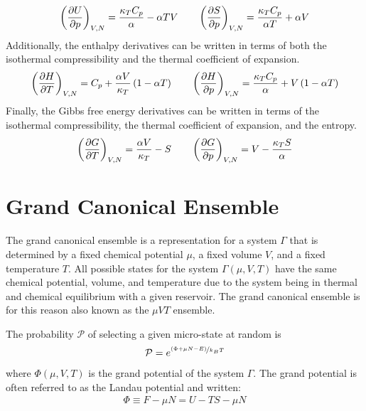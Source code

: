 \begin{align}
    \left( \pdv{U}{p} \right )_{V,N} = \frac{\kappa_T C_p}{\alpha} - \alpha TV \quad\quad
    \left( \pdv{S}{p} \right )_{V,N} = \frac{\kappa_T C_p}{\alpha T} + \alpha V
\end{align}
Additionally, the enthalpy derivatives can be written in terms of both the isothermal compressibility and the thermal coefficient of expansion.
\begin{align}
    \left( \pdv{H}{T} \right )_{V,N} = C_p + \frac{\alpha V}{\kappa_T}\left(1-\alpha T\right) \quad\quad
    \left( \pdv{H}{p} \right )_{V,N} = \frac{\kappa_T C_p}{\alpha} + V\left(1-\alpha T\right)
\end{align}
Finally, the Gibbs free energy derivatives can be written in terms of the isothermal compressibility, the thermal coefficient of expansion, and the entropy.
\begin{align}
    \left( \pdv{G}{T} \right )_{V,N} = \frac{\alpha V}{\kappa_T}-S \quad\quad
    \left( \pdv{G}{p} \right )_{V,N} = V-\frac{\kappa_T S}{\alpha}
\end{align}

\section{Grand Canonical Ensemble}
The grand canonical ensemble is a representation for a system $\Gamma$ that is determined by a fixed chemical potential $\mu$, a fixed volume $V$, and a fixed temperature $T$. All possible states for the system $\Gamma\left(\mu,V,T\right)$ have the same chemical potential, volume, and temperature due to the system being in thermal and chemical equilibrium with a given reservoir.
The grand canonical ensemble is for this reason also known as the $\mu VT$ ensemble.

The probability $\mathcal{P}$ of selecting a given micro-state at random is
\begin{align}
    \mathcal{P} = e^{\nicefrac{\left(\Phi + \mu N-E\right)}{k_BT}}
\end{align}
where $\Phi\left(\mu,V,T\right)$ is the grand potential of the system $\Gamma$. The grand potential is often referred to as the Landau potential and written:
\begin{align}
    \Phi \equiv F -\mu N = U - TS -\mu N
\end{align}


